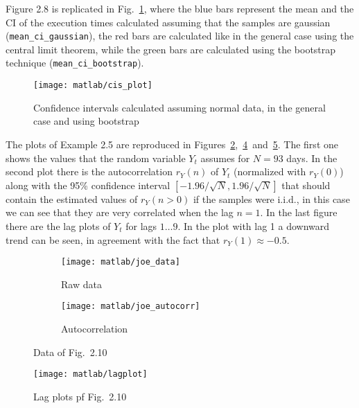 \documentclass{article}
\newcommand{\inlinecode}[1]{\lstinline[basicstyle=\ttfamily,keywordstyle={}]{#1}}
\begin{document}
    Figure 2.8 is replicated in Fig.~\ref{cis_plot}, where the blue
    bars represent the mean and the CI of the execution times
    calculated assuming that the samples are gaussian
    (\inlinecode{mean_ci_gaussian}), the red bars are calculated like
    in the general case using the central limit theorem, while the
    green bars are calculated using the bootstrap technique
    (\inlinecode{mean_ci_bootstrap}).
    \begin{figure}[htbp]
    \centering
    \texttt{[image: matlab/cis\_plot]}
    \caption{Confidence intervals calculated assuming normal data, in
      the general case and using bootstrap}
    \label{cis_plot}
    \end{figure}
    
    The plots of Example 2.5 are reproduced in
    Figures~\ref{joe_data},~\ref{joe_autocorr}~and~\ref{joe_lagplot}. The
    first one shows the values that the random variable $Y_t$ assumes
    for $N = 93$ days. In the second plot there is the autocorrelation
    $r_Y(n)$ of $Y_t$ (normalized with $r_Y(0)$) along with the 95\%
    confidence interval $[-1.96/\sqrt{N}, 1.96/\sqrt{N}]$ that should
    contain the estimated values of $r_Y(n>0)$ if the samples were
    i.i.d., in this case we can see that they are very correlated when
    the lag $n=1$.  In the last figure there are the lag plots of
    $Y_t$ for lags $1\dots9$. In the plot with lag 1 a downward trend
    can be seen, in agreement with the fact that $r_Y(1) \approx
    -0.5$.
    \begin{figure}[htbp]
      \centering
      \begin{subfigure}{.5\textwidth}
        \centering
        \texttt{[image: matlab/joe\_data]}
        \caption{Raw data}
        \label{joe_data}
      \end{subfigure}%
      \begin{subfigure}{.5\textwidth}
        \centering
        \texttt{[image: matlab/joe\_autocorr]}
        \caption{Autocorrelation}
        \label{joe_autocorr}
      \end{subfigure}
      \caption{Data of Fig.~2.10}
    \end{figure}
    \begin{figure}[htbp]
      \centering
      \texttt{[image: matlab/lagplot]}
      \caption{Lag plots pf Fig.~2.10}
      \label{joe_lagplot}
    \end{figure}
    
\end{document}
